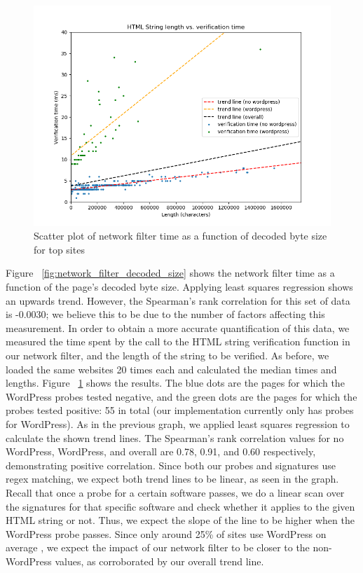 \begin{figure}[h]
	\includegraphics[scale=0.4]{results/string_length_vs_verification_time}
	\caption{Scatter plot of network filter time as a function of decoded byte size for top sites}
	\label{fig:verification_time_string_length}
\end{figure}

Figure ~\ref{fig:network_filter_decoded_size} shows the network filter time as a function of the page's decoded byte size. Applying least squares regression shows an upwards trend. However, the Spearman's rank correlation for this set of data is -0.0030; we believe this to be due to the number of factors affecting this measurement. In order to obtain a more accurate quantification of this data, we measured the time spent by the call to the HTML string verification function in our network filter, and the length of the string to be verified. As before, we loaded the same websites 20 times each and calculated the median times and lengths. Figure ~\ref{fig:verification_time_string_length} shows the results. The blue dots are the pages for which the WordPress probes tested negative, and the green dots are the pages for which the probes tested positive: 55 in total (our implementation currently only has probes for WordPress). As in the previous graph, we applied least squares regression to calculate the shown trend lines. The Spearman's rank correlation values for no WordPress, WordPress, and overall are 0.78, 0.91, and 0.60 respectively, demonstrating positive correlation. Since both our probes and signatures use regex matching, we expect both trend lines to be linear, as seen in the graph. Recall that once a probe for a certain software passes, we do a linear scan over the signatures for that specific software and check whether it applies to the given HTML string or not. Thus, we expect the slope of the line to be higher when the WordPress probe passes. Since only around 25\% of sites use WordPress on average \cite{w3techs}, we expect the impact of our network filter to be closer to the non-WordPress values, as corroborated by our overall trend line.

